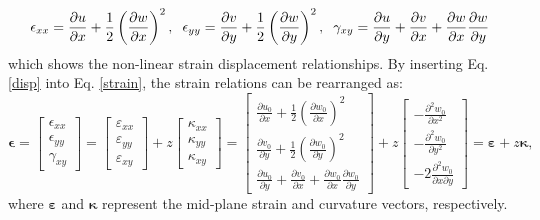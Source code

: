 \documentclass[journal]{new-aiaa}
\begin{document}
\begin{equation}
\label{strain}
\epsilon_{xx}   = \frac{\partial u}{\partial x}  +  \frac{1}{2}  \left(\frac{\partial w}{\partial x} \right)^2,  \hspace {0.2cm} \epsilon_{yy}  = \frac{\partial v}{\partial y}  +  \frac{1}{2}  \left(\frac{\partial w}{\partial y} \right)^2,  \hspace {0.2cm}
\gamma_{xy} = \frac{\partial u}{\partial y} + \frac{\partial v}{\partial x} + \frac{\partial w}{\partial x}\frac{\partial w}{\partial y}
\end{equation}
which shows the non-linear strain displacement relationships. By inserting Eq. \eqref{disp} into Eq. \eqref{strain}, the strain relations can be rearranged as:
\begin{equation}
\label{strain1}
\boldsymbol \epsilon =  \begin{bmatrix}
\epsilon_{xx} \\ \epsilon_{yy} \\ \gamma_{xy}
\end{bmatrix} =
\begin{bmatrix}
\varepsilon_{xx} \\ \varepsilon_{yy} \\ \varepsilon_{xy}
\end{bmatrix} + z
\begin{bmatrix}
\kappa_{xx} \\ \kappa_{yy} \\ \kappa_{xy}
\end{bmatrix}  =
\begin{bmatrix}
\frac{\partial u_{0}}{\partial x}  +  \frac{1}{2}  \left(\frac{\partial w_{0}}{\partial x} \right)^2 \\
\frac{\partial v_{0}}{\partial y}  +  \frac{1}{2}  \left(\frac{\partial w_{0}}{\partial y} \right)^2 \\
\frac{\partial u_{0}}{\partial y}  + \frac{\partial v_{0}}{\partial x} +\frac{\partial w_{0}}{\partial x}\frac{\partial w_{0}}{\partial y}
\end{bmatrix} +
z   \begin{bmatrix}
- \frac{\partial^{2} w_{0}}{\partial x^{2}} \\
- \frac{\partial^{2} w_{0}}{\partial y^{2}}  \\
-2 \frac{\partial^{2} w_{0}}{\partial x \partial y}
\end{bmatrix} =
\boldsymbol \varepsilon + z  \boldsymbol \kappa,
\end{equation}
where $\boldsymbol \varepsilon$ and $\boldsymbol \kappa$ represent the mid-plane strain and curvature vectors, respectively.
\end{document}
